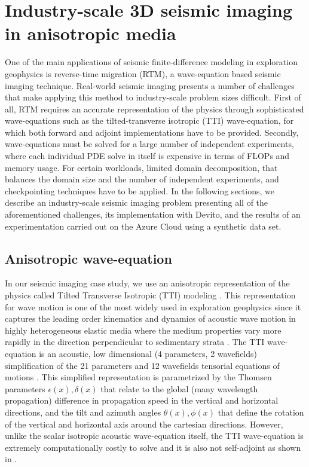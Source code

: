 \documentclass[conference]{IEEEtran}
\begin{document}
\section{Industry-scale 3D seismic imaging in anisotropic
media}\label{industry-scale-3d-seismic-imaging-in-anisotropic-media}

One of the main applications of seismic finite-difference modeling in
exploration geophysics is reverse-time migration (RTM), a wave-equation
based seismic imaging technique. Real-world seismic imaging presents a
number of challenges that make applying this method to industry-scale
problem sizes difficult. First of all, RTM requires an accurate
representation of the physics through sophisticated wave-equations such
as the tilted-transverse isotropic (TTI) wave-equation, for which both
forward and adjoint implementations have to be provided. Secondly,
wave-equations must be solved for a large number of independent
experiments, where each individual PDE solve in itself is expensive in
terms of FLOPs and memory usage. For certain workloads, limited domain
decomposition, that balances the domain size and the number of
independent experiments, and checkpointing techniques have to be applied.
In the following sections, we describe an industry-scale seismic imaging
problem presenting all of the aforementioned challenges, its
implementation with Devito, and the results of an experimentation
carried out on the Azure Cloud using a synthetic data set.

\subsection{Anisotropic wave-equation}\label{anisotropic-wave-equation}

In our seismic imaging case study, we use an anisotropic representation
of the physics called Tilted Transverse Isotropic (TTI) modeling
\cite{thomsen1986}. This representation for wave motion is one of the
most widely used in exploration geophysics since it captures the leading
order kinematics and dynamics of acoustic wave motion in highly
heterogeneous elastic media where the medium properties vary more
rapidly in the direction perpendicular to sedimentary strata
\cite{alkhalifah2000, baysal1983, bubetti2012, bubetti2014, bubesatti2016, chu2011, duveneck, fletcher, fowlertti2010, louboutin2018segeow, whitmore1983, witte2016segpve, xu2014, zhang2005, zhang2011, zhan2013}.
The TTI wave-equation is an acoustic, low dimensional (4 parameters, 2
wavefields) simplification of the 21 parameters and 12 wavefields
tensorial equations of motions \cite{hooke}. This simplified
representation is parametrized by the Thomsen parameters
$\epsilon(x), \delta(x)$ that relate to the global (many wavelength
propagation) difference in propagation speed in the vertical and
horizontal directions, and the tilt and azimuth angles
$\theta(x), \phi(x)$ that define the rotation of the vertical and
horizontal axis around the cartesian directions. However, unlike the
scalar isotropic acoustic wave-equation itself, the TTI wave-equation is
extremely computationally costly to solve and it is also not
self-adjoint as shown in \cite{louboutin2018segeow}.
\end{document}
